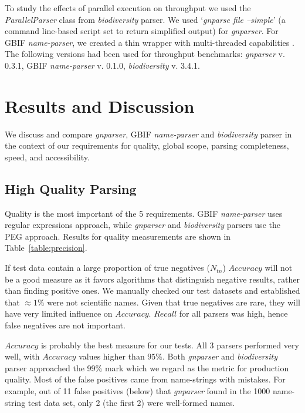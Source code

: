 \documentclass{bmcart}
\begin{document}
To study the effects of parallel execution on throughput we used the \textit{ParallelParser} class from \textit{biodiversity} parser. We used `\textit{gnparse file --simple}' (a command line-based script set to return simplified output) for \textit{gnparser}. For GBIF \textit{name-parser}, we created a thin wrapper with multi-threaded capabilities \cite{gbifparser}. The following versions had been used for throughput benchmarks: \textit{gnparser} v. 0.3.1, GBIF \textit{name-parser} v.  0.1.0, \textit{biodiversity} v. 3.4.1.


\section*{Results and Discussion}\label{sec:discussion}

We discuss and compare \textit{gnparser}, GBIF \textit{name-parser} and \textit{biodiversity} parser in the context of our requirements for quality, global scope, parsing completeness, speed, and accessibility.


\subsection*{High Quality Parsing}

Quality is the most important of the 5 requirements. GBIF \textit{name-parser} uses regular expressions approach, while \textit{gnparser} and \textit{biodiversity} parsers use the PEG approach. Results for quality measurements are shown in Table~\ref{table:precision}.

If test data contain a large proportion of true negatives ($N_{tn}$) $Accuracy$ will not be a good measure as it favors algorithms that distinguish negative results, rather than finding positive ones. We manually checked our test datasets and established that $\approx1\%$ were not scientific names. Given that true negatives are rare, they will have very limited influence on $Accuracy$. $Recall$ for all parsers was high, hence false negatives are not important.

$Accuracy$ is probably the best measure for our tests. All 3 parsers performed very well, with $Accuracy$ values higher than $95\%$. Both \textit{gnparser} and \textit{biodiversity} parser approached the 99\% mark which we regard as the metric for production quality. Most of the false positives came from name-strings with mistakes. For example, out of 11 false positives (below) that \textit{gnparser} found in the 1000 name-string test data set, only 2 (the first 2) were well-formed names.
\end{document}
